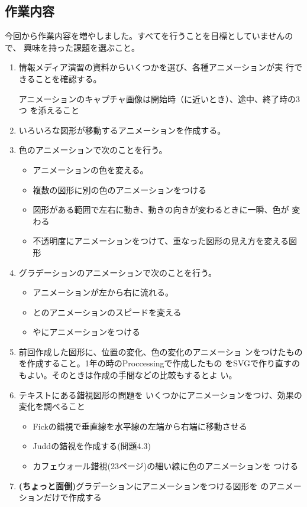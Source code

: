 \documentclass[a4j]{jarticle}
\begin{document}
\subsection{作業内容}
今回から作業内容を増やしました。すべてを行うことを目標としていませんので、
興味を持った課題を選ぶこと。%
\begin{enumerate}
 \item 情報メディア演習の資料からいくつかを選び、各種アニメーションが実
       行できることを確認する。

アニメーションのキャプチャ画像は開始時（に近いとき）、途中、終了時の3つ
       を添えること
 \item いろいろな図形が移動するアニメーションを作成する。
 \item 色のアニメーションで次のことを行う。
\begin{itemize}
  \item アニメーションの色を変える。
  \item 複数の図形に別の色のアニメーションをつける
   \item 図形がある範囲で左右に動き、動きの向きが変わるときに一瞬、色が
         変わる
 \item 不透明度にアニメーションをつけて、重なった図形の見え方を変える図
       形
\end{itemize}
 \item グラデーションのアニメーションで次のことを行う。
       \begin{itemize}
         \item アニメーションが左から右に流れる。
        \item {}とのアニメーションのスピードを変える
        \item {}やにアニメーションをつける
       \end{itemize}
 \item 前回作成した図形に、位置の変化、色の変化のアニメーショ
       ンをつけたものを作成すること。1年の時のProccessingで作成したもの
       をSVGで作り直すのもよい。そのときは作成の手間などの比較もするとよ
       い。
 \item テキストにある錯視図形の問題を
       いくつかにアニメーションをつけ、効果の変化を調べること
       \begin{itemize}
        \item Fickの錯視で垂直線を水平線の左端から右端に移動させる
        \item Juddの錯視を作成する(問題4.3)
        \item カフェウォール錯視(23ページ)の細い線に色のアニメーションを
              つける
       \end{itemize}
 \item {\bfseries (ちょっと面倒)}グラデーションにアニメーションをつける図形を
       のアニメーションだけで作成する
\end{enumerate}
\end{document}
